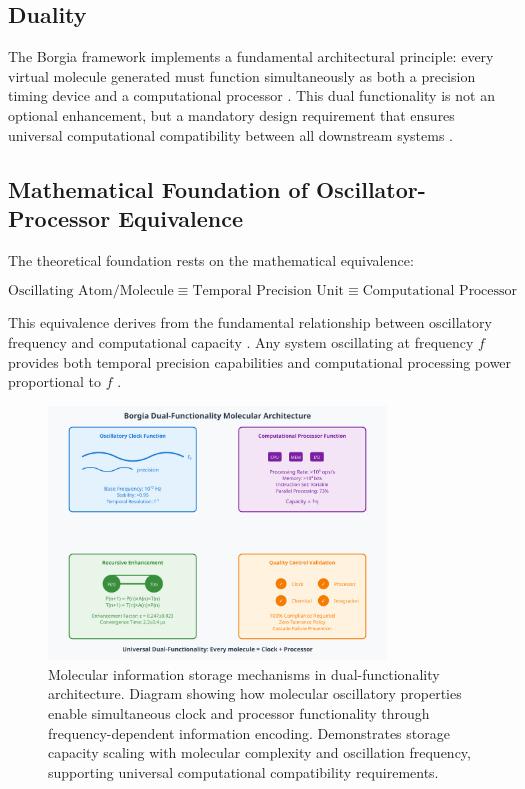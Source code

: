 \documentclass[12pt,a4paper]{article}
\begin{document}
\subsection{Duality}

The Borgia framework implements a fundamental architectural principle: every virtual molecule generated must function simultaneously as both a precision timing device and a computational processor . This dual functionality is not an optional enhancement, but a mandatory design requirement that ensures universal computational compatibility between all downstream systems \cite{sterling2015principles}.

\subsection{Mathematical Foundation of Oscillator-Processor Equivalence}

The theoretical foundation rests on the mathematical equivalence:

\begin{equation}
\text{Oscillating Atom/Molecule} \equiv \text{Temporal Precision Unit} \equiv \text{Computational Processor}
\end{equation}

This equivalence derives from the fundamental relationship between oscillatory frequency and computational capacity \cite{landauer1961irreversibility}. Any system oscillating at frequency $f$ provides both temporal precision capabilities and computational processing power proportional to $f$ \cite{lloyd2000ultimate}.
\begin{figure}[H]
    \centering
    \includegraphics[width=0.8\textwidth]{images/molecular-information-storage-mechanisms.pdf}
    \caption{Molecular information storage mechanisms in dual-functionality architecture. Diagram showing how molecular oscillatory properties enable simultaneous clock and processor functionality through frequency-dependent information encoding. Demonstrates storage capacity scaling with molecular complexity and oscillation frequency, supporting universal computational compatibility requirements.}
    \label{fig:molecular_storage}
\end{figure}
\end{document}
